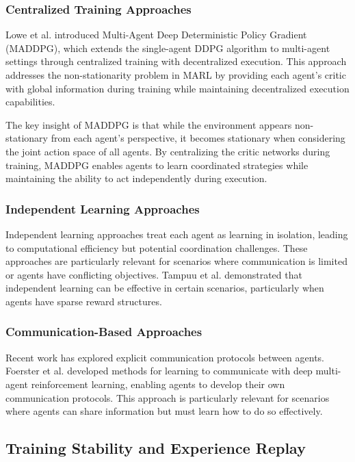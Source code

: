 \documentclass[conference]{IEEEtran}
\begin{document}
\subsubsection{Centralized Training Approaches}

Lowe et al. \cite{lowe2017multi} introduced Multi-Agent Deep Deterministic Policy Gradient (MADDPG), which extends the single-agent DDPG algorithm \cite{lillicrap2015continuous} to multi-agent settings through centralized training with decentralized execution. This approach addresses the non-stationarity problem in MARL by providing each agent's critic with global information during training while maintaining decentralized execution capabilities.

The key insight of MADDPG is that while the environment appears non-stationary from each agent's perspective, it becomes stationary when considering the joint action space of all agents. By centralizing the critic networks during training, MADDPG enables agents to learn coordinated strategies while maintaining the ability to act independently during execution.

\subsubsection{Independent Learning Approaches}

Independent learning approaches treat each agent as learning in isolation, leading to computational efficiency but potential coordination challenges. These approaches are particularly relevant for scenarios where communication is limited or agents have conflicting objectives. Tampuu et al. \cite{tampuu2017multiagent} demonstrated that independent learning can be effective in certain scenarios, particularly when agents have sparse reward structures.

\subsubsection{Communication-Based Approaches}

Recent work has explored explicit communication protocols between agents. Foerster et al. \cite{foerster2016learning} developed methods for learning to communicate with deep multi-agent reinforcement learning, enabling agents to develop their own communication protocols. This approach is particularly relevant for scenarios where agents can share information but must learn how to do so effectively.

\subsection{Training Stability and Experience Replay}
\end{document}
